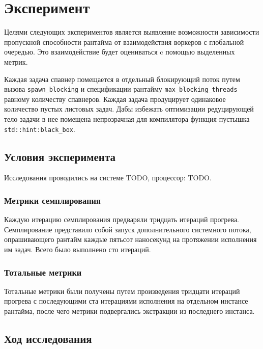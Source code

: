 
\section{Эксперимент}

Целями следующих экспериментов является выявление возможности зависимости пропускной способности рантайма от взаимодействия воркеров с глобальной очередью. Это взаимодействие будет оцениваться c помощью выделенных метрик.

Каждая задача спавнер помещается в отдельный блокирующий поток путем вызова \verb|spawn_blocking| и спецификации рантайму \verb|max_blocking_threads| равному количеству спавнеров. Каждая задача продуцирует одинаковое количество пустых листовых задач. Дабы избежать оптимизации редуцирующей тело задачи в нее помещена непрозрачная для компилятора функция-пустышка \verb|std::hint:black_box|.

\subsection{Условия эксперимента}

Исследования проводились на системе TODO, процессор: TODO.

\subsubsection{Метрики семплирования}

Каждую итерацию семплирования предваряли тридцать итераций прогрева. Семплирование представило собой запуск дополнительного системного потока, опрашивающего рантайм каждые пятьсот наносекунд на протяжении исполнения им задач. Всего было выполнено сто итераций.

\subsubsection{Тотальные метрики}

Тотальные метрики были получены путем произведения тридцати итераций прогрева с последующими ста итерациями исполнения на отдельном инстансе рантайма, после чего метрики подвергались экстракции из последнего инстанса.

\subsection{Ход исследования}

